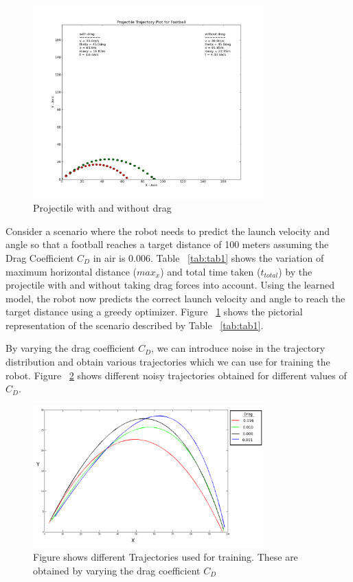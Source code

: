 \documentclass[conference]{IEEEtran}
\begin{document}
\begin{figure}[!t]
\centering
\includegraphics[width=3.5in]{fig1}
\caption{Projectile with and without drag}
\label{fig:fig1}
\end{figure}

Consider a scenario where the robot needs to predict the launch velocity and angle so that a football reaches a target distance of 100 meters assuming the Drag Coefficient $C_{D}$ in air is 0.006.  Table ~\ref{tab:tab1} shows the variation of maximum horizontal distance ($max_{x}$) and total time taken ($t_{total}$) by the projectile with and without taking drag forces into account. Using the learned model, the robot now predicts the correct launch velocity and angle to reach the target distance using a greedy optimizer. Figure ~\ref{fig:fig1} shows the pictorial representation of the scenario described by Table ~\ref{tab:tab1}.  

By varying the drag coefficient $C_{D}$, we can introduce noise in the trajectory distribution and obtain various trajectories which we can use for training the robot. Figure ~\ref{fig:fig2} shows different noisy trajectories obtained for different values of $C_{D}$.

\begin{figure}[!t]
\centering
\includegraphics[width=3.5in]{fig2}
\caption{Figure shows different Trajectories used for training. These are obtained by varying the drag coefficient $C_{D}$}
\label{fig:fig2}
\end{figure}
\end{document}
